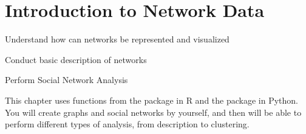 \chapter{Introduction to Network Data}
\label{chap:network}

\begin{abstract}{Abstract}
  
Especially social media data, but also other types of data can often be represented as networks. This chapter introduces  (R+Python) and  (Python) to showcase how to deal with such data, perform Social Network Analysis (SNA) and represent it visually. 
\end{abstract}


\begin{objectives}
\item Understand how can networks be represented and visualized
\item Conduct basic description of networks
\item Perform Social Network Analysis
\end{objectives}

\begin{feature}
This chapter uses functions from the package  in R and the package  in Python. You will create graphs and social networks by yourself, and then will be able to perform different types of analysis, from description to clustering.
\end{feature}



